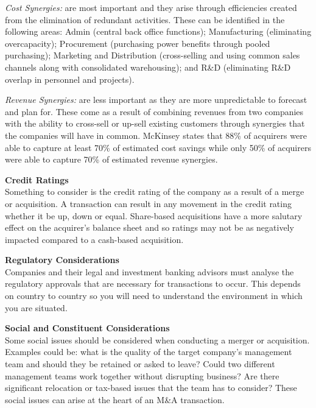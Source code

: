 \documentclass[10pt, a4paper]{article}
\begin{document}
\vspace{5pt}
\noindent \textit{Cost Synergies:} are most important and they arise through efficiencies created from the elimination of redundant activities. These can be identified in the following areas: Admin (central back office functions); Manufacturing (eliminating overcapacity); Procurement (purchasing power benefits through pooled purchasing); Marketing and Distribution (cross-selling and using common sales channels along with consolidated warehousing); and R\&D (eliminating R\&D overlap in personnel and projects).

\vspace{5pt}
\noindent \textit{Revenue Synergies:} are less important as they are more unpredictable to forecast and plan for. These come as a result of combining revenues from two companies with the ability to cross-sell or up-sell existing customers through synergies that the companies will have in common. McKinsey states that 88\% of acquirers were able to capture at least 70\% of estimated cost savings while only 50\% of acquirers were able to capture 70\% of estimated revenue synergies.

\vspace{10pt}
\noindent \textbf{Credit Ratings}\\
Something to consider is the credit rating of the company as a result of a merge or acquisition. A transaction can result in any movement in the credit rating whether it be up, down or equal. Share-based acquisitions have a more salutary effect on the acquirer's balance sheet and so ratings may not be as negatively impacted compared to a cash-based acquisition.

\vspace{10pt}
\noindent \textbf{Regulatory Considerations}\\
Companies and their legal and investment banking advisors must analyse the regulatory approvals that are necessary for transactions to occur. This depends on country to country so you will need to understand the environment in which you are situated.

\vspace{10pt}
\noindent \textbf{Social and Constituent Considerations}\\
Some social issues should be considered when conducting a merger or acquisition. Examples could be: what is the quality of the target company's management team and should they be retained or asked to leave? Could two different management teams work together without disrupting business? Are there significant relocation or tax-based issues that the team has to consider? These social issues can arise at the heart of an M\&A transaction.
\end{document}
